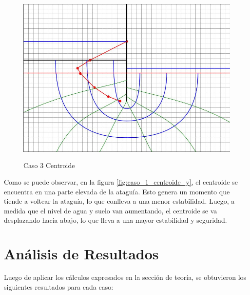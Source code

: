 \begin{figure}[H]
\begin{minipage}{0.32\textwidth}
        \centering
        \includegraphics[width=\textwidth]{GRAFICOS/caso_3_centroide_y.jpg}
        \caption{Caso 3 Centroide}
        \label{fig:caso_3_centroide_y}
    \end{minipage}
\end{figure}

Como se puede observar, en la figura \ref{fig:caso_1_centroide_y}, el centroide se encuentra en una parte elevada de la ataguía. Esto genera un momento que tiende a voltear la ataguía, lo que conlleva a una menor estabilidad. Luego, a medida que el nivel de agua y suelo van aumentando, el centroide se va desplazando hacia abajo, lo que lleva a una mayor estabilidad y seguridad. 

\section{Análisis de Resultados}

Luego de aplicar los cálculos expresados en la sección de teoría, se obtuvieron los siguientes resultados para cada caso:

